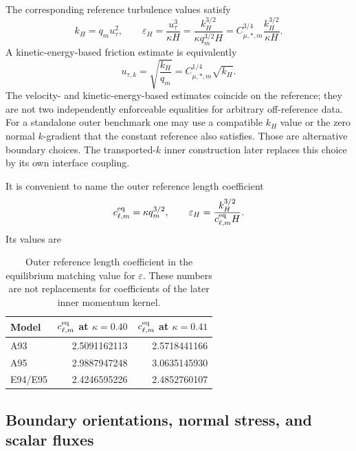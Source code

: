 \documentclass[11pt,a4paper]{article}
\numberwithin{equation}{section}
\newcommand{\eps}{\varepsilon}
\begin{document}
The corresponding reference turbulence values satisfy
\begin{equation}
 \boxed{k_H=q_m u_\tau^2,\qquad
 \eps_H=\frac{u_\tau^3}{\kappa H}
        =\frac{k_H^{3/2}}{\kappa q_m^{3/2}H}
        =C_{\mu,*,m}^{3/4}\frac{k_H^{3/2}}{\kappa H}.}
 \label{out:wallvalues}
\end{equation}
A kinetic-energy-based friction estimate is equivalently
\begin{equation}
 u_{\tau,k}=\sqrt{\frac{k_H}{q_m}}
           =C_{\mu,*,m}^{1/4}\sqrt{k_H}.
 \label{out:utauk}
\end{equation}
The velocity- and kinetic-energy-based estimates coincide on the
reference; they are not two independently enforceable equalities for
arbitrary off-reference data. For a standalone outer benchmark one may
use a compatible $k_H$ value or the zero normal $k$-gradient that the
constant reference also satisfies. Those are alternative boundary
choices. The transported-$k$ inner construction later replaces this
choice by its own interface coupling.

It is convenient to name the outer reference length coefficient
\begin{equation}
 c_{\ell,m}^{\rm eq}=\kappa q_m^{3/2},\qquad
 \eps_H=\frac{k_H^{3/2}}{c_{\ell,m}^{\rm eq}H}.
 \label{out:cell}
\end{equation}
Its values are
\begin{table}[htbp]
\centering
\caption{Outer reference length coefficient in the equilibrium
matching value for $\eps$. These numbers are not replacements for
coefficients of the later inner momentum kernel.}
\label{out:celltable}
\begin{tabular}{lrr}
\toprule
Model & $c_{\ell,m}^{\rm eq}$ at $\kappa=0.40$
& $c_{\ell,m}^{\rm eq}$ at $\kappa=0.41$\\
\midrule
A93 & 2.5091162113 & 2.5718441166\\
A95 & 2.9887947248 & 3.0635145930\\
E94/E95 & 2.4246595226 & 2.4852760107\\
\bottomrule
\end{tabular}
\end{table}

\subsection{Boundary orientations, normal stress, and scalar fluxes}
\label{out:boundarysigns}
\end{document}
